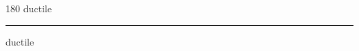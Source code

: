 
\begin{frame}
\begin{center}
\begin{turn}{180}
{\fontsize{2.5cm}{1em}\selectfont ductile}
\end{turn}
\vspace{1em}\par  
\hrule
\vspace{1em}\par  
{\fontsize{2.5cm}{1em}\selectfont ductile}
\end{center}
\end{frame}
